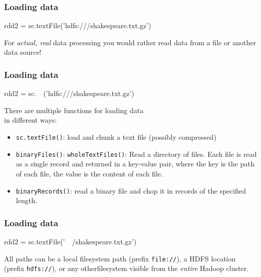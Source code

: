 \documentclass[english,serif,mathserif]{beamer}
\begin{document}
\begin{frame}[fragile]
  \frametitle{Loading data}
  \begin{center}
    \begin{python}
rdd2 = sc.textFile('hdfs:///shakespeare.txt.gz')
    \end{python}

    \+ For \emph{actual, real} data processing you would rather
    read data from a file or another data source!
  \end{center}
\end{frame}


\begin{frame}[fragile]
  \frametitle{Loading data}
  \begin{center}
    \begin{python}
rdd2 = sc.~~('hdfs:///shakespeare.txt.gz')
    \end{python}

    \+\small There are multiple functions for loading data \\ in
    different ways:
    \begin{itemize}
    \item \texttt{sc.textFile()}: load and chunk a text file (possibly compressed)
    \item \texttt{binaryFiles()}: \texttt{wholeTextFiles()}: Read a
      directory of files. Each file is read as a single record and
      returned in a key-value pair, where the key is the path of each
      file, the value is the content of each file.
    \item \texttt{binaryRecords()}: read a binary file and chop it in
      records of the specified length.
    \end{itemize}
  \end{center}
\end{frame}


\begin{frame}[fragile]
  \frametitle{Loading data}
  \begin{center}
    \begin{python}
rdd2 = sc.textFile('~~/shakespeare.txt.gz')
    \end{python}

    \+ All paths can be a local filesystem path (prefix
    \texttt{file://}), a HDFS location (prefix \texttt{hdfs://}), or
    any otherfilesystem visible from the \emph{entire} Hadoop cluster.
  \end{center}
\end{frame}
\end{document}
